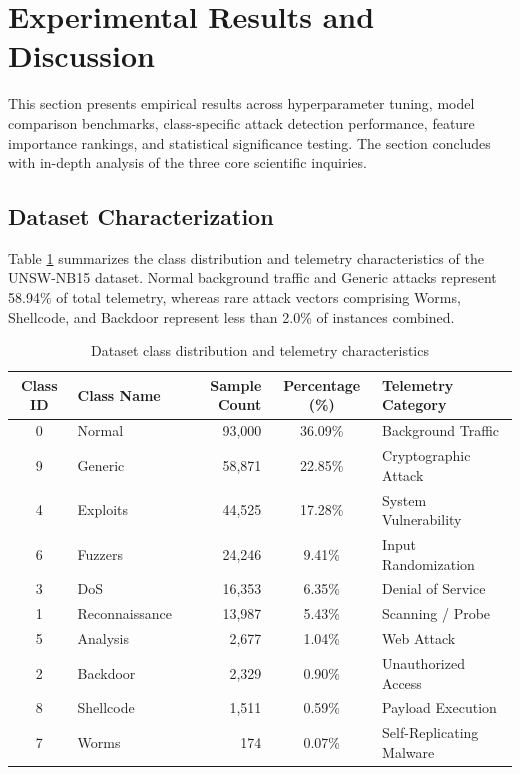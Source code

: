 \documentclass[10pt,conference,compsoc]{IEEEtran}
\begin{document}
\section{Experimental Results and Discussion}

This section presents empirical results across hyperparameter tuning, model comparison benchmarks, class-specific attack detection performance, feature importance rankings, and statistical significance testing. The section concludes with in-depth analysis of the three core scientific inquiries.

\subsection{Dataset Characterization}
Table \ref{tab:dataset_summary} summarizes the class distribution and telemetry characteristics of the UNSW-NB15 dataset. Normal background traffic and Generic attacks represent 58.94\% of total telemetry, whereas rare attack vectors comprising Worms, Shellcode, and Backdoor represent less than 2.0\% of instances combined.

\begin{table}[t]
\caption{Dataset class distribution and telemetry characteristics}
\label{tab:dataset_summary}
\centering
\begin{tabular}{clrcl}
\toprule
\textbf{Class ID} & \textbf{Class Name} & \textbf{Sample Count} & \textbf{Percentage (\%)} & \textbf{Telemetry Category} \\
\midrule
0 & Normal & 93,000 & 36.09\% & Background Traffic \\
9 & Generic & 58,871 & 22.85\% & Cryptographic Attack \\
4 & Exploits & 44,525 & 17.28\% & System Vulnerability \\
6 & Fuzzers & 24,246 & 9.41\% & Input Randomization \\
3 & DoS & 16,353 & 6.35\% & Denial of Service \\
1 & Reconnaissance & 13,987 & 5.43\% & Scanning / Probe \\
5 & Analysis & 2,677 & 1.04\% & Web Attack \\
2 & Backdoor & 2,329 & 0.90\% & Unauthorized Access \\
8 & Shellcode & 1,511 & 0.59\% & Payload Execution \\
7 & Worms & 174 & 0.07\% & Self-Replicating Malware \\
\bottomrule
\end{tabular}
\end{table}
\end{document}
